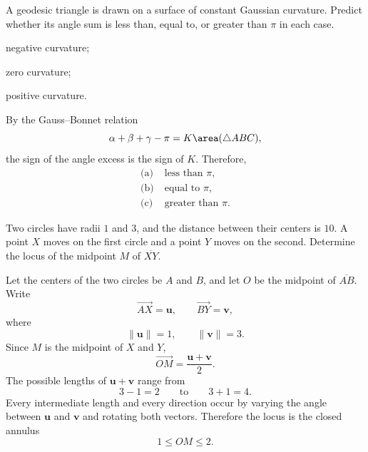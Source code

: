 
    \begin{expectedproblem}
        A geodesic triangle is drawn on a surface of constant Gaussian
        curvature. Predict whether its angle sum is less than, equal to, or
        greater than $\pi$ in each case.
        \begin{problemsubparts}
            \item negative curvature;
            \item zero curvature;
            \item positive curvature.
        \end{problemsubparts}
    \end{expectedproblem}

    \begin{solution}
        By the Gauss--Bonnet relation
        \[
            \alpha+\beta+\gamma-\pi
            =
            K\area(\triangle ABC),
        \]
        the sign of the angle excess is the sign of $K$. Therefore,
        \[
            \boxed{
                \begin{aligned}
                    \text{(a)}\;&\text{less than }\pi,\\
                    \text{(b)}\;&\text{equal to }\pi,\\
                    \text{(c)}\;&\text{greater than }\pi.
                \end{aligned}
            }
        \]
    \end{solution}

    \begin{expectedproblem}[1996 Putnam]
        Two circles have radii $1$ and $3$, and the distance between their
        centers is $10$. A point $X$ moves on the first circle and a point $Y$
        moves on the second. Determine the locus of the midpoint $M$ of
        $\overline{XY}$.
    \end{expectedproblem}

    \begin{solution}
        Let the centers of the two circles be $A$ and $B$, and let $O$ be the
        midpoint of $\overline{AB}$. Write
        \[
            \overrightarrow{AX}=\mathbf{u},
            \qquad
            \overrightarrow{BY}=\mathbf{v},
        \]
        where
        \[
            \|\mathbf{u}\|=1,
            \qquad
            \|\mathbf{v}\|=3.
        \]
        Since $M$ is the midpoint of $X$ and $Y$,
        \[
            \overrightarrow{OM}
            =
            \frac{\mathbf{u}+\mathbf{v}}{2}.
        \]
        The possible lengths of $\mathbf{u}+\mathbf{v}$ range from
        \[
            3-1=2
            \qquad\text{to}\qquad
            3+1=4.
        \]
        Every intermediate length and every direction occur by varying the
        angle between $\mathbf{u}$ and $\mathbf{v}$ and rotating both vectors.
        Therefore the locus is the closed annulus
        \[
            \boxed{1\leq OM\leq2}.
        \]
    \end{solution}


